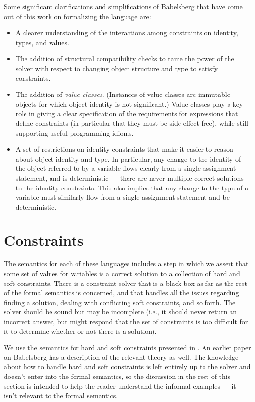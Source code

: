 \documentclass{article}
\begin{document}
Some significant clarifications and simplifications of Babelsberg that
have come out of this work on formalizing the language are:

\begin{itemize}
\item A clearer understanding of the interactions among constraints
  on identity, types, and values.
\item The addition of structural compatibility checks to tame the
  power of the solver with respect to changing object structure and
  type to satisfy constraints.
\item The addition of \emph{value classes}.  (Instances of value
  classes are immutable objects for which object identity is not
  significant.)  Value classes play a key role in giving a clear specification
  of the requirements for expressions that define constraints (in
  particular that they must be side effect free), while still supporting
  useful programming idioms.
\item A set of restrictions on identity constraints that make it
  easier to reason about object identity and type.  In particular, any
  change to the identity of the object referred to by a variable flows
  clearly from a single assignment statement, and is deterministic ---
  there are never multiple correct solutions to the identity
  constraints.  This also implies that any change to the type of a
  variable must similarly flow from a single assignment statement and
  be deterministic.
\end{itemize}

\section{Constraints}
\label{sec:constraints}

The semantics for each of these languages includes a step in which we
assert that some set of values for variables is a correct solution to
a collection of hard and soft constraints.  There is a constraint
solver that is a black box as far as the rest of the formal semantics
is concerned, and that handles all the issues regarding finding a
solution, dealing with conflicting soft constraints, and so forth.
The solver should be sound but may be incomplete (i.e., it should
never return an incorrect answer, but might respond that the set of
constraints is too difficult for it to determine whether or not there
is a solution).

We use the semantics for hard and soft constraints presented in
\cite{borning-lisp-symbolic-computation-1992}.  An earlier paper on
Babelsberg \cite{felgentreff-babelsberg-tr} has a description of the
relevant theory as well.  The knowledge about how to handle hard
and soft constraints is left entirely up to the solver and doesn't
enter into the formal semantics, so the discussion in the rest of this
section is intended to help the reader understand the informal
examples --- it isn't relevant to the formal semantics.
\end{document}
